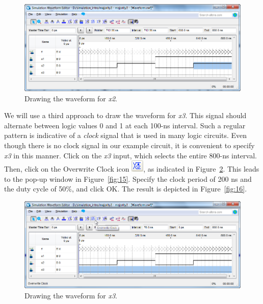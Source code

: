 \documentclass[11pt, twoside, pdftex]{article}
\begin{document}
\begin{figure}[H]
   \begin{center}
      \includegraphics[scale=0.65]{figures/figure13.png}
   \caption{Drawing the waveform for {\it x2}.} 
	 \label{fig:13}
	 \end{center}
\end{figure}

We will use a third approach to draw the waveform for {\it x3}. This signal
should alternate between logic values 0 and 1 at each 100-ns interval.
Such a regular pattern is indicative of a {\it clock} signal that is used in many logic circuits.
Even though there is no clock signal in our example circuit, 
it is convenient to specify {\it x3} in this manner.
Click on the {\it x3} input, which selects the entire 800-ns interval. Then, click on the
{\sf Overwrite Clock} icon \hbox{\includegraphics[scale=0.7]{figures/icon4.png}}, as 
indicated in Figure~\ref{fig:14}.  This leads to the pop-up window in Figure~\ref{fig:15}. 
Specify the clock period of 200 ns and the duty
cycle of 50\%, and click {\sf OK}. The result is depicted in Figure~\ref{fig:16}.
~\\

\begin{figure}[H]
   \begin{center}
      \includegraphics[scale=0.65]{figures/figure14.png}
   \caption{Drawing the waveform for {\it x3}.} 
	 \label{fig:14}
	 \end{center}
\end{figure}
\end{document}
